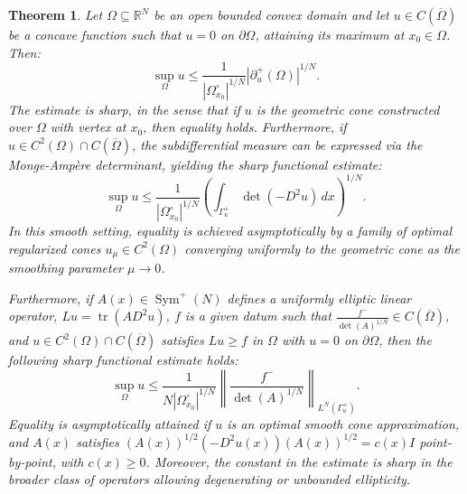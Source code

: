 \documentclass{article}
\newtheorem{theorem}{Theorem}[section]
\numberwithin{equation}{section}
\begin{document}
\begin{theorem}\label{thm5.6}
Let $\Omega \subseteq \mathbb{R}^N$ be an open bounded convex domain and let $u \in C(\overline{\Omega})$ be a concave function such that $u=0$ on $\partial \Omega$, attaining its maximum at $x_0 \in \Omega$. Then:
\begin{equation}\label{eq:sharp_polar_abp}
\sup_\Omega u \le \frac{1}{|\Omega_{x_0}^\circ|^{1/N}} |\partial^+_u(\Omega)|^{1/N}.
\end{equation}
The estimate is sharp, in the sense that if $u$ is the geometric cone constructed over $\Omega$ with vertex at $x_0$, then equality holds. Furthermore, if $u \in C^2(\Omega) \cap C(\overline{\Omega})$, the subdifferential measure can be expressed via the Monge-Ampère determinant, yielding the sharp functional estimate:
\begin{equation}\label{eq:sharp_ma_smooth}
\sup_\Omega u \le \frac{1}{|\Omega_{x_0}^\circ|^{1/N}} \left( \int_{\Gamma^+_u} \det(-D^2u) \, dx \right)^{1/N}.
\end{equation}
In this smooth setting, equality is achieved asymptotically by a family of optimal regularized cones $u_\mu \in C^2(\Omega)$ converging uniformly to the geometric cone as the smoothing parameter $\mu \to 0$.

\noindent Furthermore, if $A(x) \in \operatorname{Sym}^+(N)$ defines a uniformly elliptic linear operator, $Lu = \operatorname{tr}(A D^2u)$, $f$ is a given datum such that $\frac{f^-}{\det(A)^{1/N}} \in C(\overline{\Omega})$, and $u \in C^2(\Omega) \cap C(\overline{\Omega})$ satisfies $Lu \ge f$ in $\Omega$ with $u=0$ on $\partial \Omega$, then the following sharp functional estimate holds:
\begin{equation}\label{eq:ABPN}
\sup_\Omega u \le \frac{1}{N|\Omega^\circ_{x_0}|^{1/N}} \left\| \frac{f^-}{\det(A)^{1/N}} \right\|_{L^N(\Gamma^+_u)}.
\end{equation}
Equality is asymptotically attained if $u$ is an optimal smooth cone approximation, and $A(x)$ satisfies $(A(x))^{1/2}(-D^2u(x))(A(x))^{1/2} = c(x)I$ point-by-point, with $c(x) \ge 0$. Moreover, the constant in the estimate is sharp in the broader class of operators allowing degenerating or unbounded ellipticity.
\end{theorem}
\end{document}
